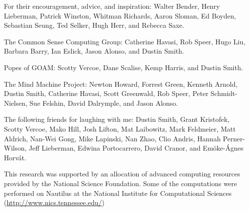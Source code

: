 \vspace{5mm}

\noindent For their encouragement, advice, and inspiration:
Walter Bender,
Henry Lieberman,
Patrick Winston,
Whitman Richards,
Aaron Sloman,
Ed Boyden,
Sebastian Seung,
Ted Selker,
Hugh Herr, and
Rebecca Saxe.

\vspace{5mm}

\noindent The Common Sense Computing Group:
Catherine Havasi,
Rob Speer,
Hugo Liu,
Barbara Barry,
Ian Eslick,
Jason Alonso, and
Dustin Smith.

\vspace{5mm}

\noindent Popes of GOAM:
Scotty Vercoe,
Dane Scalise,
Kemp Harris, and
Dustin Smith.

\vspace{5mm}

\noindent The Mind Machine Project:
Newton Howard, Forrest Green, Kenneth Arnold, Dustin Smith, Catherine Havasi, Scott Greenwald, Rob Speer, Peter Schmidt-Nielsen, Sue Felshin, David Dalrymple, and Jason Alonso.

\vspace{5mm}

\noindent
The following friends for laughing with me:
Dustin Smith, %
Grant Kristofek, %
Scotty Vercoe,
Mako Hill, %
Josh Lifton, %
Mat Laibowitz, %
Mark Feldmeier, %
Matt Aldrich, %
Nan-Wei Gong, %
Mike Lapinski, %
Nan Zhao, %
Clio Andris, %
Hannah Perner-Wilson, %
Jeff Lieberman, %
Edwina Portocarrero, %
David Cranor, and %
Em\"{o}ke-\'{A}gnes Horv\'{a}t. %

\vspace{5mm}

\vspace{5mm}

\noindent
This research was supported by an allocation of advanced computing
resources provided by the National Science Foundation.  Some of the
computations were performed on Nautilus at the National Institute for
Computational Sciences (\url{http://www.nics.tennessee.edu/})

\endgroup

